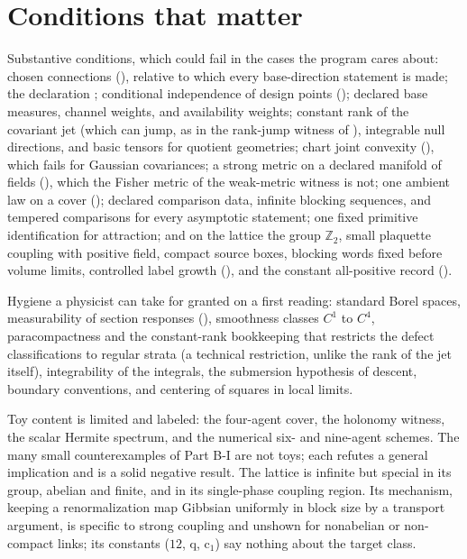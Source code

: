 \section{Conditions that matter}
\label{comp:sb-hygiene}

\begin{hygiene}
Substantive conditions, which could fail in the cases the program cares about: chosen connections
(), relative to which every base-direction statement is made; the declaration
; conditional independence of design points ();
declared base measures, channel weights, and availability weights; constant rank of the covariant jet
(which can jump, as in the rank-jump witness of ), integrable null directions, and basic tensors for quotient
geometries; chart joint convexity (),
which fails for Gaussian covariances; a strong metric on a declared manifold of fields
(), which the Fisher metric of the weak-metric witness is not; one
ambient law on a cover
(); declared comparison data, infinite blocking sequences, and tempered
comparisons for every asymptotic statement; one fixed primitive identification for attraction; and on the
lattice the group \(\mathbb Z_2\), small plaquette coupling with positive field, compact source boxes,
blocking words fixed before volume limits, controlled label growth (), and
the constant all-positive record ().

Hygiene a physicist can take for granted on a first reading: standard Borel spaces, measurability of section
responses (), smoothness classes \(C^1\) to \(C^4\), paracompactness and
the constant-rank bookkeeping that restricts the defect classifications to regular strata (a technical
restriction, unlike the rank of the jet itself), integrability of the integrals, the submersion hypothesis of descent,
boundary conventions, and centering of squares in local limits.
\end{hygiene}

Toy content is limited and labeled: the four-agent cover, the holonomy witness, the scalar Hermite spectrum,
and the numerical six- and nine-agent schemes. The many small counterexamples of Part B-I are not toys;
each refutes a general implication and is a solid negative result. The lattice is infinite but special in
its group, abelian and finite, and in its single-phase coupling region. Its mechanism, keeping a renormalization map
Gibbsian uniformly in block size by a transport argument, is specific to strong coupling and unshown for
nonabelian or non-compact links; its constants (\(12\), \(\mathrm q\), \(\mathrm c_1\)) say nothing about the
target class.

